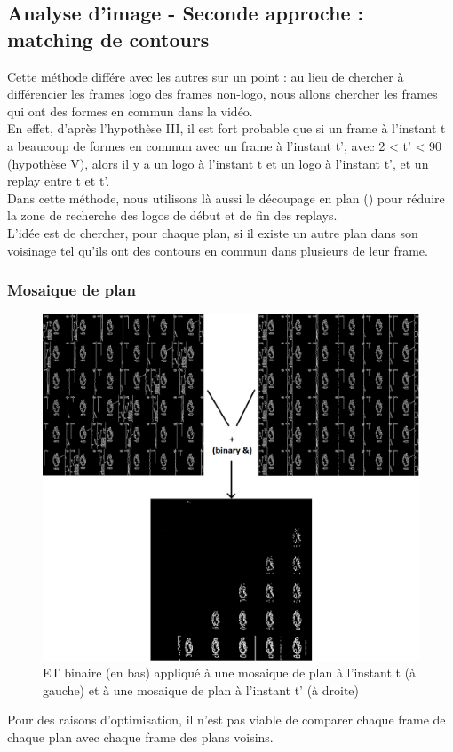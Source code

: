 \documentclass[11pt]{article}
\begin{document}
\subsection{Analyse d'image - Seconde approche : matching de contours}
\label{sec:orgb20809b}
Cette méthode différe avec les autres sur un point : au lieu de chercher à différencier les frames logo des frames non-logo, nous allons chercher les frames qui ont des formes en commun dans la vidéo.\\
En effet, d'après l'hypothèse III, il est fort probable que si un frame à l'instant t a beaucoup de formes en commun avec un frame à l'instant t', avec 2 < t' < 90 (hypothèse V), alors il y a un logo à l'instant t et un logo à l'instant t', et un replay entre t et t'.\\

Dans cette méthode, nous utilisons là aussi le découpage en plan (\cite{Abd_Almageed_2008}) pour réduire la zone de recherche des logos de début et de fin des replays.\\

L'idée est de chercher, pour chaque plan, si il existe un autre plan dans son voisinage tel qu'ils ont des contours en commun dans plusieurs de leur frame.\\


\subsubsection{Mosaique de plan}
\label{sec:org5134691}
\begin{figure}[htbp]
\centering
\includegraphics[width=16cm]{mosaique_add.png}
\caption{ET binaire (en bas) appliqué à une mosaique de plan à l'instant t (à gauche) et à une mosaique de plan à l'instant t' (à droite) \label{mosaic}}
\end{figure}
Pour des raisons d'optimisation, il n'est pas viable de comparer chaque frame de chaque plan avec chaque frame des plans voisins.\\
\end{document}
